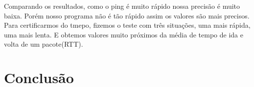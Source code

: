 \documentclass[10pt,a4paper]{article}
\begin{document}
Comparando os resultados, como o ping é muito rápido nossa precisão é
muito baixa. Porém nosso programa não é tão rápido assim os valores
são mais precisos. Para certificarmos do tmepo, fizemos o teste com
três situações, uma mais rápida, uma mais lenta. E obtemos valores
muito próximos da média de tempo de ida e volta de um pacote(RTT). 

\section{Conclusão}


\begin{small}
  
\end{small}
\end{document}
